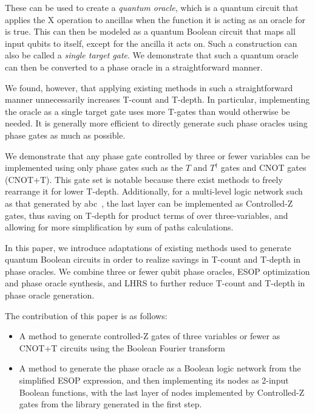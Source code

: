 These can be used to create a {\it quantum oracle}, which is a quantum circuit
that applies the X operation to ancillas when the function it is acting as an
oracle for is true. This can then be modeled as a quantum Boolean circuit that
maps all input qubits to itself, except for the ancilla it acts on. Such a construction
can also be called a {\it single target gate}. We demonstrate that such a quantum oracle
can then be converted to a phase oracle in a straightforward manner. 

We found, however, that applying existing methods in such a straightforward manner
unnecessarily increases T-count and T-depth. In particular, implementing the oracle
as a single target gate uses more T-gates than would otherwise be needed. It is
generally more efficient to directly generate such phase oracles using phase gates
as much as possible. 

We demonstrate that any phase gate controlled by three or fewer variables can be implemented using
only phase gates such as the $T$ and $T^{\dagger}$ gates and CNOT gates (CNOT+T). This
gate set is notable because there exist methods to freely rearrange it for lower
T-depth. Additionally, for a multi-level logic network such as that generated by
abc~\cite{bib-mishchenko-lut}, the last layer can be implemented as Controlled-Z gates,
thus saving on T-depth for product terms of over three-variables, and allowing for more
simplification by sum of paths calculations.

In this paper, we introduce adaptations of existing methods used to generate quantum
Boolean circuits in order to realize savings in T-count and T-depth in phase oracles.
We combine three or fewer qubit phase oracles, ESOP optimization and phase oracle synthesis,
and LHRS to further reduce T-count and T-depth in phase oracle generation.

The contribution of this paper is as follows:

\begin{itemize}
\item A method to generate controlled-Z gates of three variables or fewer as
  CNOT+T circuits using the Boolean Fourier transform
\item A method to generate the phase oracle as a Boolean logic network from the
  simplified ESOP expression, and then implementing its nodes as 2-input Boolean functions,
  with the last layer of nodes implemented by Controlled-Z gates from the library generated
  in the first step.
\end{itemize}


